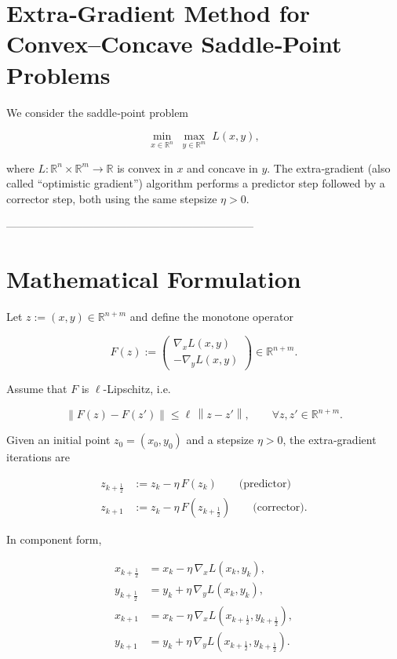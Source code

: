 \documentclass{article}
\newcommand{\R}{\mathbb{R}}
\newcommand{\norm}[1]{\left\lVert #1\right\rVert}
\newcommand{\grad}{\nabla}
\begin{document}
\section*{Extra‑Gradient Method for Convex–Concave Saddle‑Point Problems}

We consider the saddle‑point problem  

\[
\min_{x\in\R^{n}}\;\max_{y\in\R^{m}} \;L(x,y),
\]

where \(L:\R^{n}\times\R^{m}\rightarrow\R\) is convex in \(x\) and concave in \(y\).  
The extra‑gradient (also called ``optimistic gradient'') algorithm performs a
predictor step followed by a corrector step, both using the same stepsize
\(\eta>0\).

--------------------------------------------------------------------
\section*{Mathematical Formulation}
Let \(z:=(x,y)\in\R^{n+m}\) and define the monotone operator  

\[
F(z):=
\begin{pmatrix}
\grad_{x}L(x,y)\\[2mm]
-\grad_{y}L(x,y)
\end{pmatrix}\in\R^{n+m}.
\]

Assume that \(F\) is \(\ell\)-Lipschitz, i.e.  

\[
\norm{F(z)-F(z')}\le \ell\,\norm{z-z'},\qquad\forall z,z'\in\R^{n+m}.
\]

Given an initial point \(z_{0}=(x_{0},y_{0})\) and a stepsize \(\eta>0\),
the extra‑gradient iterations are  

\[
\boxed{
\begin{aligned}
z_{k+\frac12}&:=z_{k}-\eta\,F(z_{k})\qquad\text{(predictor)}\\[1mm]
z_{k+1}&:=z_{k}-\eta\,F(z_{k+\frac12})\qquad\text{(corrector)} .
\end{aligned}}
\tag{EG}
\]

In component form,

\[
\begin{aligned}
x_{k+\frac12}&=x_{k}-\eta\,\grad_{x}L(x_{k},y_{k}),\\
y_{k+\frac12}&=y_{k}+\eta\,\grad_{y}L(x_{k},y_{k}),\\[1mm]
x_{k+1}&=x_{k}-\eta\,\grad_{x}L(x_{k+\frac12},y_{k+\frac12}),\\
y_{k+1}&=y_{k}+\eta\,\grad_{y}L(x_{k+\frac12},y_{k+\frac12}).
\end{aligned}
\]
\end{document}
